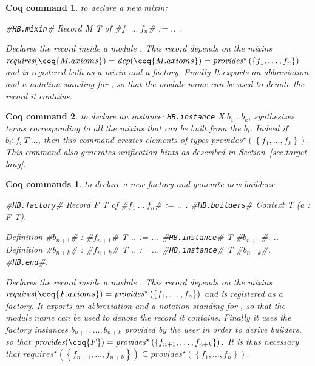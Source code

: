 \documentclass[a4paper,UKenglish,cleveref, autoref]{lipics-v2019}
\newcommand{\mixin}{mixin}
\newcommand{\mixins}{mixins}
\newcommand{\factory}{factory}
\newcommand{\phantterm}{abbreviation}
\newcommand{\mixinbuilders}{builders}
\newcommand{\factoryinstances}{factory instances}
\newcommand{\dep}{\ensuremath{\mathit{dep}}}
\newcommand{\requires}{\ensuremath{\mathit{requires}}}
\newcommand{\provides}{\ensuremath{\mathit{provides}}}
\newcommand{\set}[1]{\left\{#1\right\}}
\newcommand{\enum}[2]{\ensuremath{\set{#1,\ldots,#2}}}
\newcommand{\hbmixin}{{\tt\color{dkgreen}HB.mixin}}
\newcommand{\hbfactory}{{\tt\color{dkgreen}HB.factory}}
\newcommand{\hbinstance}{{\tt\color{dkgreen}HB.instance}}
\newcommand{\hbbuilders}{{\tt\color{dkgreen}HB.builders}}
\newcommand{\hbend}{{\tt\color{dkgreen}HB.end}}
\theoremstyle{implem}
\theoremstyle{implem}
\theoremstyle{command}
\newtheorem*{command}{Coq command}
\theoremstyle{commands}
\newtheorem*{commands}{Coq commands}
\begin{document}
\begin{command} to declare a new mixin:
\begin{coqcode}
#\hbmixin{}# Record M T of #$f_1\ \ldots\ f_n$# := { .. }.
\end{coqcode}
  Declares the record  inside a module .
  This record  depends on the \mixins{}
  \(\requires{}(\coq{M.axioms}) = \dep{}(\coq{M.axioms}) =
  \provides{}^\star\left(\enum{f_1}{f_n}\right)\)
  and is registered both as a \mixin{} and a \factory{}. Finally It exports an
  \phantterm{}  and a notation
   standing for , so that the module name can be used to
  denote the  record it contains.
\end{command}

\begin{command} to declare an instance: \hbinstance{}
  \(X\ b_1 \ldots b_k\), synthesizes terms corresponding to all the
  \mixins{} that can be built from the $b_i$. Indeed if
  \(b_i : f_i\ T\ \ldots\), then this command creates elements of types
  \(\provides{}^\star\left(\enum{f_1}{f_k}\right).\) This command also
  generates unification hints as described in
  Section~\ref{sec:target-lang}.
\end{command}

\begin{commands} to declare a new \factory{} and generate new \mixinbuilders:
\begin{coqcode}
#\hbfactory{}# Record F T of #$f_1\ \ldots\ f_n$# := { .. }.
#\hbbuilders{}# Context T (a : F T).

  Definition #$b_{n+1}$# : #$f_{n+1}$# T .. := ...
  #\hbinstance{}# T #$b_{n+1}$#.
  ..
  Definition #$b_{n+k}$# : #$f_{n+k}$# T .. := ...
  #\hbinstance{}# T #$b_{n+k}$#.
#\hbend{}#.
\end{coqcode}
  Declares the record  inside a module .
  This record  depends on the mixins
  \(\requires{}(\coq{F.axioms}) =
  \provides{}^\star\left(\enum{f_1}{f_n}\right)\) and is registered
  as a factory.  It exports an
  \phantterm{}  and a notation
   standing for , so that the module name can be used to
  denote the  record it contains.
  Finally it uses the \factoryinstances{}
  \(b_{n+1}, \ldots, b_{n+k}\) provided by the user in order to derive
  \mixinbuilders{}, so that
  \(\provides{}(\coq{F}) = \provides{}^\star\left(\enum{f_{n+1}}{f_{n+k}}\right).\)
  It is thus necessary that
  \(\requires{}^\star\left(\enum{f_{n+1}}{f_{n+k}}\right) \subseteq
  \provides{}^\star\left(\enum{f_1}{f_n}\right).\)
\end{commands}
\end{document}
